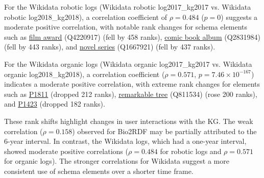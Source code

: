 \documentclass[sw]{iosart2x}
\begin{document}
For the Wikidata robotic logs (Wikidata robotic log2017\_kg2017 vs. Wikidata robotic log2018\_kg2018), a correlation coefficient of $\rho = 0.484$ ($p = 0$) suggests a
moderate positive correlation, with notable rank changes for schema elements such as 
\href{http://www.wikidata.org/entity/Q4220917}{film award} (Q4220917) (fell by 458 ranks), 
\href{http://www.wikidata.org/entity/Q2831984}{comic book album} (Q2831984) (fell by 443 ranks), and 
\href{http://www.wikidata.org/entity/Q1667921}{novel series} (Q1667921) (fell by 437 ranks).

For the Wikidata organic logs (Wikidata organic log2017\_kg2017 vs. Wikidata organic log2018\_kg2018), a correlation coefficient ($\rho = 0.571$, $p = 7.46 \times 10^{-167}$) indicates a moderate positive correlation, with extreme rank changes for elements such as 
\href{http://www.wikidata.org/prop/direct/P1811}{P1811} (dropped 212 ranks), 
\href{http://www.wikidata.org/entity/Q811534}{remarkable tree} (Q811534) (rose 200 ranks), and 
\href{http://www.wikidata.org/prop/direct/P1423}{P1423} (dropped 182 ranks).

These rank shifts highlight changes in user interactions with the KG. The weak correlation ($\rho = 0.158$) observed for Bio2RDF may be partially attributed to the 6-year interval. In contrast, the Wikidata logs, which had a one-year interval, showed moderate positive correlations ($\rho = 0.484$ for robotic logs and $\rho = 0.571$ for organic logs). The stronger correlations for Wikidata suggest a more consistent use of schema elements over a shorter time frame.

\end{document}
